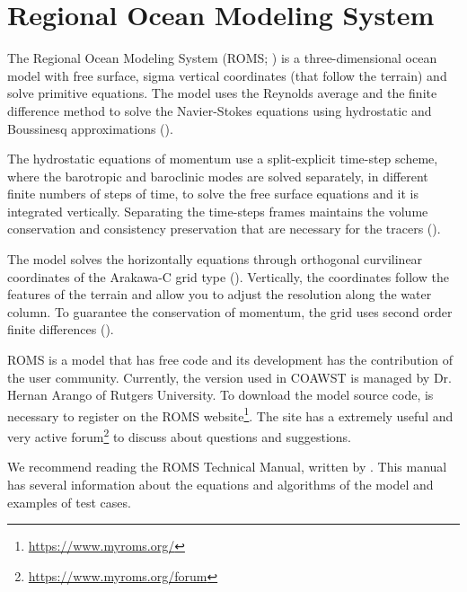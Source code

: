 
\section{Regional Ocean Modeling System}\label{romssecao}
\bigskip
 The Regional Ocean Modeling System (ROMS; \cite{Shchepetkin2005}) is a three-dimensional ocean model with free surface, sigma vertical coordinates 
(that follow the terrain) and solve primitive equations. The model uses the Reynolds average and the finite difference method to 
solve the Navier-Stokes equations using hydrostatic and Boussinesq approximations (\cite{Haidvogel2008}).
\bigskip

 The hydrostatic equations of momentum use a split-explicit time-step scheme, where the barotropic and baroclinic modes are solved separately, in
different finite numbers of steps of time, to solve the free surface equations and it is integrated vertically. Separating the time-steps frames maintains 
the volume conservation and consistency preservation that are necessary for the tracers (\cite{Shchepetkin2005, Haidvogel2008}).
\bigskip

 The model solves the horizontally equations through orthogonal curvilinear coordinates of the Arakawa-C grid type (\cite{Arakawa1977}). Vertically, the 
coordinates follow the features of the terrain and allow you to adjust the resolution along the water column. To guarantee the conservation of momentum, the grid uses
second order finite differences (\cite{Haidvogel2008}).
\bigskip

 ROMS is a model that has free code and its development has the contribution of the user community. Currently, the version used in COAWST is managed by Dr.
Hernan Arango of Rutgers University. To download the model source code, is necessary to register on the
ROMS website\textcolor{bleu_cite}{\textit{}\footnote{\textcolor{bleu_cite}{\href{https://www.myroms.org/}{https://www.myroms.org/}}}}. 
The site has a extremely useful and very active forum\textcolor{bleu_cite}{\textit{}\footnote{\textcolor{bleu_cite}{\href{https://www.myroms.org/forum}{https://www.myroms.org/forum}}}} 
to discuss about questions and suggestions.
\bigskip

\begin{tcolorbox}[enhanced,
    grow to left by   = 0cm,
    grow to right by  = 0cm,
    enlarge top by    = 0cm,
    enlarge bottom by = 0cm,
    tcbox raise base,
    boxrule           = 1.0pt,
    left              = 18mm,
    colframe          = green!50!black,coltext=green!25!black,colback=green!10!white,
    overlay           = {\begin{tcbclipinterior}\fill[green!75!blue!50!white] (frame.south west)
      rectangle node[text=white,font=\sffamily\bfseries\footnotesize,rotate=0] {NOTE} ([xshift=18mm]frame.north west);\end{tcbclipinterior}}]
      We recommend reading the ROMS Technical Manual, written by \textcite{hedstrom2018}. This manual has several
      information about the equations and algorithms of the model and examples of test cases.
  \end{tcolorbox}
\bigskip

